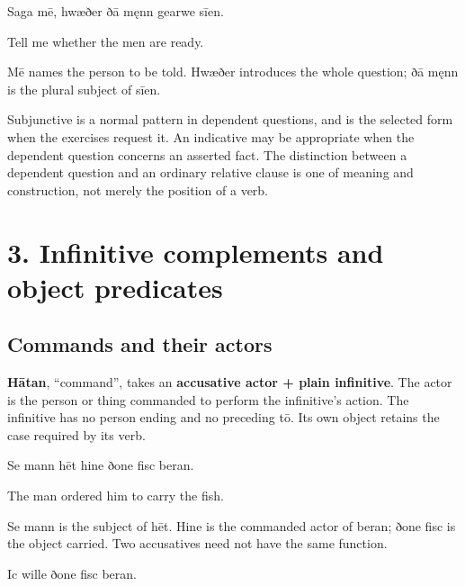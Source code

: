 Saga mē, hwæðer ðā męnn gearwe sīen.

Tell me whether the men are ready.

Mē names the person to be told. Hwæðer introduces the whole question; ðā męnn is the plural subject of sīen.

Subjunctive is a normal pattern in dependent questions, and is the selected form when the exercises request it. An indicative may be appropriate when the dependent question concerns an asserted fact. The distinction between a dependent question and an ordinary relative clause is one of meaning and construction, not merely the position of a verb.

\section*{3. Infinitive complements and object predicates}

\subsection*{Commands and their actors}

\textbf{Hātan}, “command”, takes an \textbf{accusative actor + plain infinitive}. The actor is the person or thing commanded to perform the infinitive’s action. The infinitive has no person ending and no preceding tō. Its own object retains the case required by its verb.

Se mann hēt hine ðone fisc beran.

The man ordered him to carry the fish.

Se mann is the subject of hēt. Hine is the commanded actor of beran; ðone fisc is the object carried. Two accusatives need not have the same function.

Ic wille ðone fisc beran.

